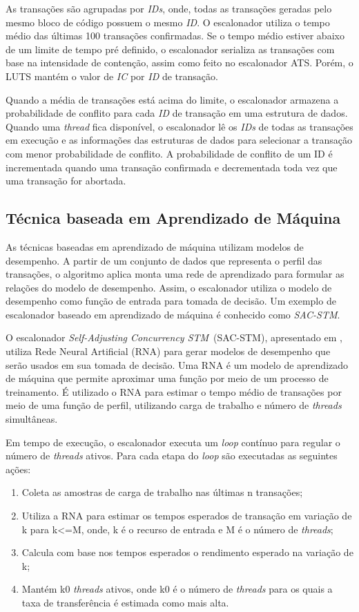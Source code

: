 \documentclass[ti]{texufpel}
\begin{document}
As transações são agrupadas por \emph{IDs}, onde, todas as transações geradas pelo mesmo bloco de código possuem o mesmo \emph{ID}. O escalonador utiliza o tempo médio das últimas 100 transações confirmadas. Se o tempo médio estiver abaixo de um limite de tempo pré definido, o escalonador serializa as transações com base na intensidade de contenção, assim como feito no escalonador ATS. Porém, o LUTS mantém o valor de \emph{IC} por \emph{ID} de transação.

Quando a média de transações está acima do limite, o escalonador armazena a probabilidade de conflito para cada \emph{ID} de transação em uma estrutura de dados. Quando uma \emph{thread} fica disponível, o escalonador lê os \emph{IDs} de todas as transações em execução e as informações das estruturas de dados para selecionar a transação com menor probabilidade de conflito. A probabilidade de conflito de um ID é incrementada quando uma transação confirmada e decrementada toda vez que uma transação for abortada.

\subsection{Técnica baseada em Aprendizado de Máquina}

As técnicas baseadas em aprendizado de máquina utilizam modelos de desempenho. A partir de um conjunto de dados que representa o perfil das transações, o algoritmo aplica monta uma rede de aprendizado para formular as relações do modelo de desempenho. Assim, o escalonador utiliza o modelo de desempenho como função de entrada para tomada de decisão. Um exemplo de escalonador baseado em aprendizado de máquina é conhecido como \emph{SAC-STM}.

O escalonador \emph{Self-Adjusting Concurrency STM}~(SAC-STM), apresentado em \cite{rughetti12}, utiliza Rede Neural Artificial (RNA) para gerar modelos de desempenho que serão usados em sua tomada de decisão. Uma RNA é um modelo de aprendizado de máquina que permite aproximar uma função por meio de um processo de treinamento. É utilizado o RNA para estimar o tempo médio de transações por meio de uma função de perfil, utilizando carga de trabalho e número de \emph{threads} simultâneas.

Em tempo de execução, o escalonador executa um \emph{loop} contínuo para regular o número de \emph{threads} ativos. Para cada etapa do \emph{loop} são executadas as seguintes ações:

\begin{enumerate}
 \item Coleta as amostras de carga de trabalho nas últimas n transações;
 \item Utiliza a RNA para estimar os tempos esperados de transação em variação de k para k<=M, onde, k é o recurso de entrada e M é o número de \emph{threads};
 \item Calcula com base nos tempos esperados o rendimento esperado na variação de k;
 \item Mantém k0 \emph{threads} ativos, onde k0 é o número de \emph{threads} para os quais a taxa de transferência é estimada como mais alta.
\end{enumerate}
\end{document}
